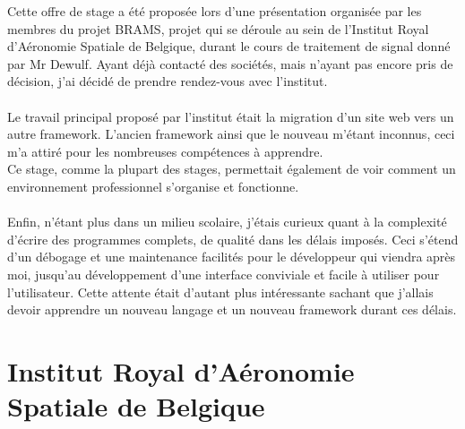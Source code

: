 \documentclass[11pt]{article}
\begin{document}
Cette offre de stage a été proposée lors d'une présentation organisée par les membres du projet BRAMS, projet qui se déroule au sein de l'Institut Royal d'Aéronomie Spatiale de Belgique, durant le cours de traitement de signal donné par Mr Dewulf.
Ayant déjà contacté des sociétés, mais n'ayant pas encore pris de décision, j'ai décidé de prendre rendez-vous avec l'institut.\\
\\
Le travail principal proposé par l'institut était la migration d'un site web vers un autre framework.
L'ancien framework ainsi que le nouveau m'étant inconnus, ceci m'a attiré pour les nombreuses compétences à apprendre.\\
Ce stage, comme la plupart des stages, permettait également de voir comment un environnement professionnel s'organise et fonctionne.\\
\\
Enfin, n'étant plus dans un milieu scolaire, j'étais curieux quant à la complexité d'écrire des programmes complets, de qualité dans les délais imposés.
Ceci s'étend d'un débogage et une maintenance facilités pour le développeur qui viendra après moi, jusqu'au développement d'une interface conviviale et facile à utiliser pour l'utilisateur.
Cette attente était d'autant plus intéressante sachant que j'allais devoir apprendre un nouveau langage et un nouveau framework durant ces délais.

\newpage

\section{Institut Royal d'Aéronomie Spatiale de Belgique}
\end{document}
